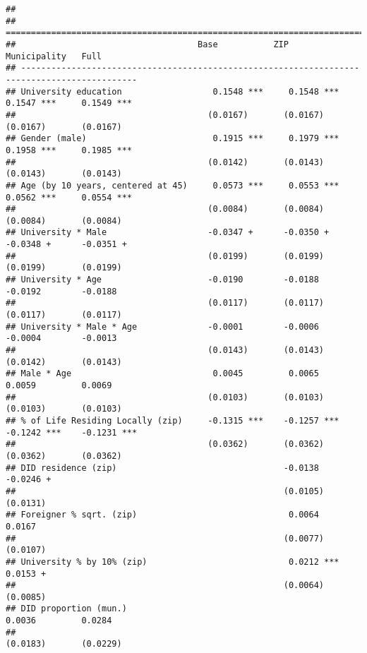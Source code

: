 \documentclass[
]{article}
\begin{document}
\begin{verbatim}
## 
## =============================================================================================
##                                    Base           ZIP            Municipality   Full         
## ---------------------------------------------------------------------------------------------
## University education                  0.1548 ***     0.1548 ***     0.1547 ***     0.1549 ***
##                                      (0.0167)       (0.0167)       (0.0167)       (0.0167)   
## Gender (male)                         0.1915 ***     0.1979 ***     0.1958 ***     0.1985 ***
##                                      (0.0142)       (0.0143)       (0.0143)       (0.0143)   
## Age (by 10 years, centered at 45)     0.0573 ***     0.0553 ***     0.0562 ***     0.0554 ***
##                                      (0.0084)       (0.0084)       (0.0084)       (0.0084)   
## University * Male                    -0.0347 +      -0.0350 +      -0.0348 +      -0.0351 +  
##                                      (0.0199)       (0.0199)       (0.0199)       (0.0199)   
## University * Age                     -0.0190        -0.0188        -0.0192        -0.0188    
##                                      (0.0117)       (0.0117)       (0.0117)       (0.0117)   
## University * Male * Age              -0.0001        -0.0006        -0.0004        -0.0013    
##                                      (0.0143)       (0.0143)       (0.0142)       (0.0143)   
## Male * Age                            0.0045         0.0065         0.0059         0.0069    
##                                      (0.0103)       (0.0103)       (0.0103)       (0.0103)   
## % of Life Residing Locally (zip)     -0.1315 ***    -0.1257 ***    -0.1242 ***    -0.1231 ***
##                                      (0.0362)       (0.0362)       (0.0362)       (0.0362)   
## DID residence (zip)                                 -0.0138                       -0.0246 +  
##                                                     (0.0105)                      (0.0131)   
## Foreigner % sqrt. (zip)                              0.0064                        0.0167    
##                                                     (0.0077)                      (0.0107)   
## University % by 10% (zip)                            0.0212 ***                    0.0153 +  
##                                                     (0.0064)                      (0.0085)   
## DID proportion (mun.)                                               0.0036         0.0284    
##                                                                    (0.0183)       (0.0229)   

\end{verbatim}
\end{document}
